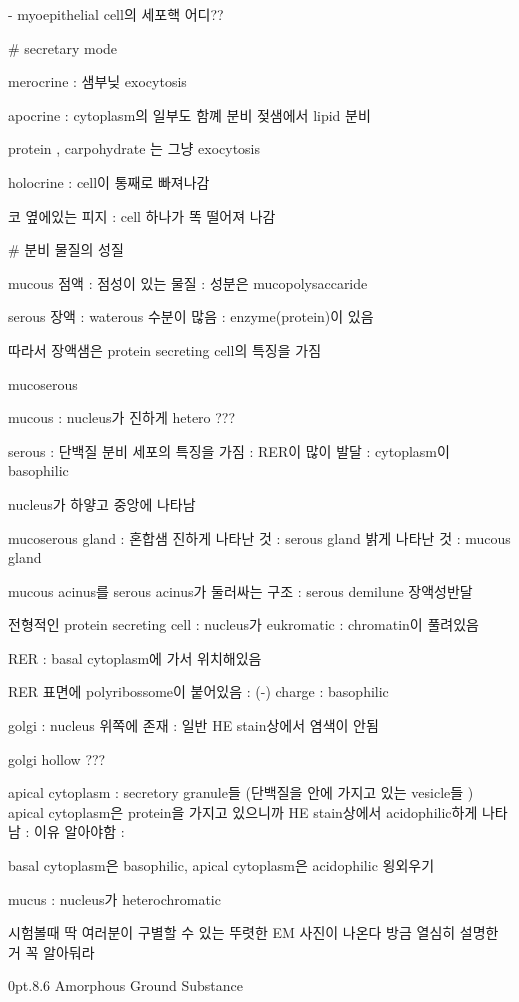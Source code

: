 \documentclass[10pt]{amsart}
\makeatletter
\numberwithin{theorem}{section}
\numberwithin{example}{section}
\theoremstyle{definition}
\theoremstyle{remark}
\renewcommand\section{\@startsection{section}{1}%
{0pt}{.8\linespacing\@plus\linespacing}{.6\linespacing}%
{\LARGE\bfseries\color{black}}}
\makeatother
\begin{document}
- myoepithelial cell의 세포핵 어디??


# secretary mode 

merocrine : 샘부닞 exocytosis

apocrine : cytoplasm의 일부도 함꼐 분비 
젖샘에서 lipid 분비 

protein , carpohydrate 는 그냥 exocytosis

holocrine : cell이 통째로 빠져나감 

코 옆에있는 피지 : cell 하나가 똑 떨어져 나감 


# 분비 물질의 성질 

mucous 점액 : 점성이 있는 물질 : 성분은 mucopolysaccaride 

serous 장액 : waterous 수분이 많음 : enzyme(protein)이 있음 

따라서 장액샘은 protein secreting cell의 특징을 가짐 


mucoserous


mucous : nucleus가 진하게 hetero ???


serous : 단백질 분비 세포의 특징을 가짐  : RER이 많이 발달 : cytoplasm이 basophilic 

nucleus가 하얗고 중앙에 나타남 

mucoserous gland : 혼합샘 
진하게 나타난 것 : serous gland
밝게 나타난 것 : mucous gland 

mucous acinus를 serous acinus가 둘러싸는 구조 : serous demilune 장액성반달 

전형적인 protein secreting cell : nucleus가 eukromatic : chromatin이 풀려있음

RER : basal cytoplasm에 가서 위치해있음 

RER 표면에 polyribossome이 붙어있음 : (-) charge : basophilic 

golgi : nucleus 위쪽에 존재 : 일반 HE stain상에서 염색이 안됨

golgi hollow ???


apical cytoplasm : secretory granule들 (단백질을 안에 가지고 있는 vesicle들 ) 
apical cytoplasm은 protein을 가지고 있으니까 HE stain상에서 acidophilic하게 나타남 : 이유 알아야함 : 

basal cytoplasm은 basophilic, apical cytoplasm은 acidophilic 욍외우기 


mucus : nucleus가 heterochromatic 

시험볼때 딱 여러분이 구별할 수 있는 뚜렷한 EM 사진이 나온다 방금 열심히 설명한 거 꼭 알아둬라 




\section{Amorphous Ground Substance}
\end{document}
